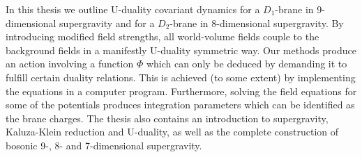 In this thesis we outline U-duality covariant dynamics for a $D_1$-brane in 9-dimensional supergravity and for a 
$D_2$-brane in 8-dimensional supergravity. By introducing modified field strengths, all world-volume fields couple 
to the background fields in a manifestly U-duality symmetric way. Our methods produce an action involving a function 
$\Phi$ which can only be deduced by demanding it to fulfill certain duality relations. This is achieved (to some extent) 
by implementing the equations in a computer program. Furthermore, solving the field equations for some of the potentials 
produces integration parameters which can be identified as the brane charges.
The thesis also contains an introduction to supergravity, Kaluza-Klein reduction and U-duality, as well as the complete 
construction of bosonic 9-, 8- and 7-dimensional supergravity.



